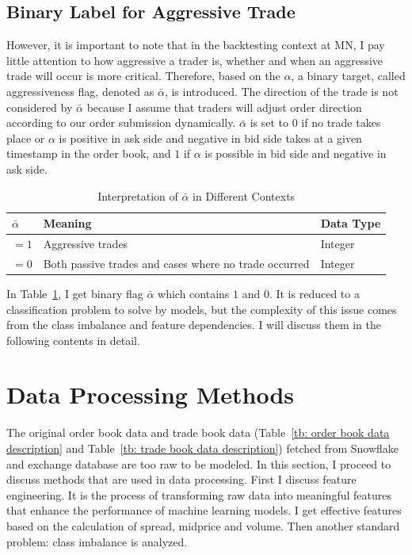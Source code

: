 \subsection{Binary Label for Aggressive Trade} \label{sec: aflag}
However, it is important to note that in the backtesting context at MN, I pay little attention to how aggressive a trader is, whether and when an aggressive trade will occur is more critical. Therefore, based on the $\alpha$, a binary target, called aggressiveness flag, denoted as $\bar{\alpha}$, is introduced. The direction of the trade is not considered by $\bar{\alpha}$ because I assume that traders will adjust order direction according to our order submission dynamically. $\bar{\alpha}$ is set to $0$ if no trade takes place or $\alpha$ is positive in ask side and negative in bid side takes at a given timestamp in the order book, and $1$ if $\alpha$ is possible in bid side and negative in ask side. 
\begin{table}[h] 
    \centering 
    \begin{tabular}{lll} 
        \toprule 
        \textbf{$\bar{\alpha}$} & \textbf{Meaning} & \textbf{Data Type} \\ 
        \midrule 
        $ = 1$ & Aggressive trades & Integer \\
        $ = 0$ & Both passive trades and cases where no trade occurred & Integer \\  
        \bottomrule 
    \end{tabular} 
    \caption{Interpretation of $\bar{\alpha}$ in Different Contexts}
    \label{tb: aflag_meaning}
\end{table}
In Table~\ref{tb: aflag_meaning}, I get binary flag $\bar{\alpha}$ which contains $1$ and $0$. It is reduced to a classification problem to solve by models, but the complexity of this issue comes from the class imbalance and feature dependencies. I will discuss them in the following contents in detail.



\section{Data Processing Methods}
The original order book data and trade book data (Table~\ref{tb: order book data description} and Table~\ref{tb: trade book data description}) fetched from Snowflake and exchange database are too raw to be modeled. In this section, I proceed to discuss methods that are used in data processing. First I discuss feature engineering. It is the process of transforming raw data into meaningful features that enhance the performance of machine learning models. I get effective features based on the calculation of spread, midprice and volume. Then another standard problem: class imbalance is analyzed.


